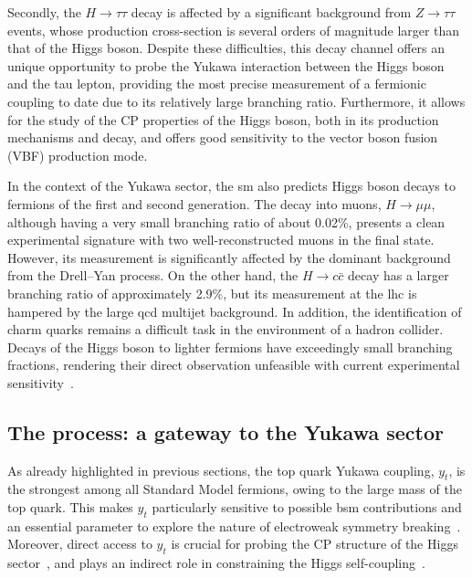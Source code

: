 Secondly, the $H \rightarrow \tau\tau$ decay is affected by a significant background from $Z \rightarrow \tau\tau$ events, whose production cross-section is several orders of magnitude larger than that of the Higgs boson. Despite these difficulties, this decay channel offers an unique opportunity to probe the Yukawa interaction between the Higgs boson and the tau lepton, providing the most precise measurement of a fermionic coupling to date due to its relatively large branching ratio. Furthermore, it allows for the study of the CP properties of the Higgs boson, both in its production mechanisms and decay, and offers good sensitivity to the vector boson fusion (VBF) production mode.

In the context of the Yukawa sector, the \acrshort{sm} also predicts Higgs boson decays to fermions of the first and second generation. The decay into muons, \( H \rightarrow \mu\mu \), although having a very small branching ratio of about 0.02\%, presents a clean experimental signature with two well-reconstructed muons in the final state. However, its measurement is significantly affected by the dominant background from the Drell--Yan process. On the other hand, the \( H \rightarrow c\bar{c} \) decay has a larger branching ratio of approximately 2.9\%, but its measurement at the \acrshort{lhc} is hampered by the large \acrshort{qcd} multijet background. In addition, the identification of charm quarks remains a difficult task in the environment of a hadron collider. Decays of the Higgs boson to lighter fermions have exceedingly small branching fractions, rendering their direct observation unfeasible with current experimental sensitivity~\cite{https://doi.org/10.23731/cyrm-2017-002}.

\subsection{The \ttH process: a gateway to the Yukawa sector}
\label{sec:ttH}
As already highlighted in previous sections, the top quark Yukawa coupling, $y_t$, is the strongest among all Standard Model fermions, owing to the large mass of the top quark. This makes $y_t$ particularly sensitive to possible \acrshort{bsm} contributions and an essential parameter to explore the nature of electroweak symmetry breaking~\cite{Englert:2014uua,Dobrescu:1997nm,Chivukula:1998wd,Delepine:1995qs}. Moreover, direct access to $y_t$ is crucial for probing the CP structure of the Higgs sector~\cite{Bernreuther:2002uj,Brod:2013cka}, and plays an indirect role in constraining the Higgs self-coupling~\cite{Buttazzo:2013uya,Degrassi:2016wml}.

